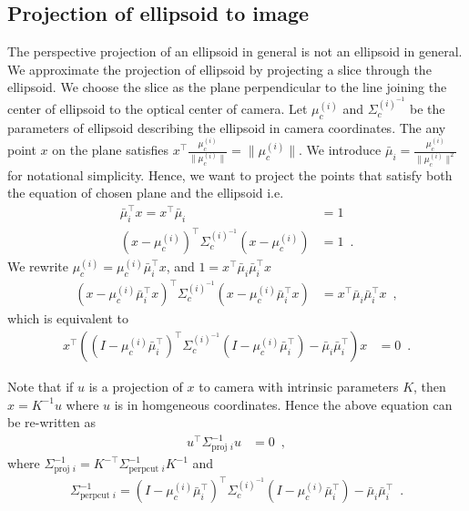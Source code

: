 \documentclass[10pt,twocolumn,letterpaper]{article}
\newcommand{\muic}{{\mu^(i)_c}}
\newcommand{\Sigmaicf}{\Sigma^{(i)^{-1}}_c}
\begin{document}
\subsection{Projection of ellipsoid to image}
\newcommand{\mubar}{\bar{\mu}_i}
The perspective projection of an ellipsoid in general is not an ellipsoid in
general. We approximate the projection of ellipsoid by projecting a slice
through the ellipsoid. We choose the slice as the plane perpendicular to the
line joining the center of ellipsoid to the optical center of camera. Let
$\muic$ and $\Sigmaicf$ be the parameters of ellipsoid describing the ellipsoid
in camera coordinates. The any point $x$ on the plane satisfies
$x^\top\frac{\muic}{\|\muic\|} = \|\muic\|$. We introduce 
$\mubar = \frac{\muic}{\|\muic\|^2}$ for notational simplicity. Hence, we want
to project the points that satisfy both the equation of chosen plane and the 
ellipsoid i.e.
\begin{align}
  \mubar^\top x = x^\top\mubar &= 1\\ 
  (x-\muic)^\top\Sigmaicf(x-\muic) &= 1 \enspace.
\end{align}
We rewrite $\muic = \muic\mubar^\top x$, and $1 = x^\top\mubar \mubar^\top x$
\begin{align}
  (x-\muic\mubar^\top x)^\top\Sigmaicf(x-\muic\mubar^\top x) &= x^\top\mubar \mubar^\top x \enspace,
\end{align}
which is equivalent to 
\begin{align}
  x^\top\left((I-\muic\mubar^\top)^\top\Sigmaicf(I-\muic\mubar^\top) - \mubar \mubar^\top\right)x &= 0\enspace.
\end{align}

Note that if $u$ is a projection of $x$ to camera with intrinsic parameters
$K$, then $x = K^{-1}u$ where $u$ is in homgeneous coordinates. Hence the above equation can be re-written as
\newcommand{\Sproj}{\Sigma^{-1}_{\text{proj }i}}
\newcommand{\Sperpcut}{\Sigma^{-1}_{\text{perpcut }i}}
\begin{align}
  u^\top\Sproj u &= 0\enspace, 
\end{align}
where $\Sproj = K^{-\top}\Sperpcut K^{-1}$ and 
\begin{align}
  \Sperpcut = (I-\muic\mubar^\top)^\top\Sigmaicf(I-\muic\mubar^\top) - \mubar \mubar^\top \enspace.
\end{align}
\end{document}
